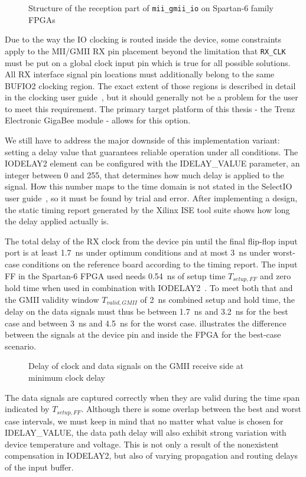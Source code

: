 \documentclass[a4paper, 11pt, oneside]{Thesis}  %
\begin{document}
\begin{figure}
\centering

\caption[Structure of the reception part of mii\_gmii\_io on Spartan-6 family FPGAs]{Structure of the reception part of \texttt{mii\_gmii\_io} on Spartan-6 family FPGAs}
\label{fig:mii_gmii_rx}
\end{figure}

Due to the way the IO clocking is routed inside the device, some constraints apply to the MII/GMII RX pin placement beyond the limitation that \texttt{RX\_CLK} must be put on a global clock input pin which is true for all possible solutions. All RX interface signal pin locations must additionally belong to the same BUFIO2 clocking region. The exact extent of those regions is described in detail in the clocking user guide~\cite{S6Clocking}, but it should generally not be a problem for the user to meet this requirement. The primary target platform of this thesis - the Trenz Electronic GigaBee module - allows for this option.

We still have to address the major downside of this implementation variant: setting a delay value that guarantees reliable operation under all conditions. The IODELAY2 element can be configured with the IDELAY\_VALUE parameter, an integer between 0 and 255, that determines how much delay is applied to the signal. How this number maps to the time domain is not stated in the SelectIO user guide~\cite{S6SelectIO}, so it must be found by trial and error. After implementing a design, the static timing report generated by the Xilinx ISE tool suite shows how long the delay applied actually is.

The total delay of the RX clock from the device pin until the final flip-flop input port is at least 1.7~ns under optimum conditions and at most 3~ns under worst-case conditions on the reference board according to the timing report. The input FF in the Spartan-6 FPGA used needs 0.54~ns of setup time $T_{setup,FF}$ and zero hold time when used in combination with IODELAY2~\cite{S6DS}. To meet both that and the GMII validity window $T_{valid,GMII}$ of 2~ns combined setup and hold time, the delay on the data signals must thus be between 1.7~ns and 3.2~ns for the best case and between 3~ns and 4.5~ns for the worst case.  illustrates the difference between the signals at the device pin and inside the FPGA for the best-case scenario. \begin{figure}
\centering

\caption{Delay of clock and data signals on the GMII receive side at minimum clock delay}
\label{fig:mii_input_timing}
\end{figure}
The data signals are captured correctly when they are valid during the time span indicated by $T_{setup,FF}$. Although there is some overlap between the best and worst case intervals, we must keep in mind that no matter what value is chosen for IDELAY\_VALUE, the data path delay will also exhibit strong variation with device temperature and voltage. This is not only a result of the nonexistent compensation in IODELAY2, but also of varying propagation and routing delays of the input buffer.
\end{document}
